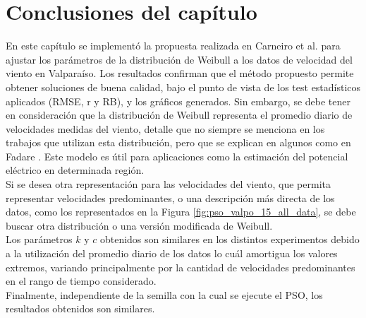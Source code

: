 \section{Conclusiones del capítulo}
En este capítulo se implementó la propuesta realizada en Carneiro et al. \cite{Carneiro15} para ajustar los parámetros de la distribución de Weibull a los datos de velocidad del viento en Valparaíso. Los resultados confirman que el método propuesto permite obtener soluciones de buena calidad, bajo el punto de vista de los test estadísticos aplicados (RMSE, r y RB), y los gráficos generados. Sin embargo, se debe tener en consideración que la distribución de Weibull representa el promedio diario de velocidades medidas del viento, detalle que no siempre se menciona en los trabajos que utilizan esta distribución, pero que se explican en algunos como en Fadare \cite{Fadare08}. Este modelo es útil para aplicaciones como la estimación del potencial eléctrico en determinada región.\\
Si se desea otra representación para las velocidades del viento, que permita representar velocidades predominantes, o una descripción más directa de los datos, como los representados en la Figura \ref{fig:pso_valpo_15_all_data}, se debe buscar otra distribución o una versión modificada de Weibull.\\
Los parámetros $k$ y $c$ obtenidos son similares en los distintos experimentos debido a la utilización del promedio diario de los datos lo cuál amortigua los valores extremos, variando principalmente por la cantidad de velocidades predominantes en el rango de tiempo considerado.\\
Finalmente, independiente de la semilla con la cual se ejecute el PSO, los resultados obtenidos son similares.